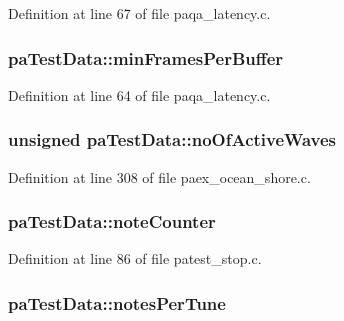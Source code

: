 Definition at line 67 of file paqa\+\_\+latency.\+c.

\subsubsection[{\texorpdfstring{min\+Frames\+Per\+Buffer}{minFramesPerBuffer}}]{ pa\+Test\+Data\+::min\+Frames\+Per\+Buffer}\hypertarget{structpa_test_data_a54a4f685949c89a98b4e45e94ccbc5fd}{}\label{structpa_test_data_a54a4f685949c89a98b4e45e94ccbc5fd}


Definition at line 64 of file paqa\+\_\+latency.\+c.

\subsubsection[{\texorpdfstring{no\+Of\+Active\+Waves}{noOfActiveWaves}}]{\setlength{\rightskip}{0pt plus 5cm}unsigned pa\+Test\+Data\+::no\+Of\+Active\+Waves}\hypertarget{structpa_test_data_acc3a4830f0a4790f7435217066a38872}{}\label{structpa_test_data_acc3a4830f0a4790f7435217066a38872}


Definition at line 308 of file paex\+\_\+ocean\+\_\+shore.\+c.

\subsubsection[{\texorpdfstring{note\+Counter}{noteCounter}}]{ pa\+Test\+Data\+::note\+Counter}\hypertarget{structpa_test_data_a8b23172d34f6fd60be4f3ae4b74b0e79}{}\label{structpa_test_data_a8b23172d34f6fd60be4f3ae4b74b0e79}


Definition at line 86 of file patest\+\_\+stop.\+c.

\subsubsection[{\texorpdfstring{notes\+Per\+Tune}{notesPerTune}}]{ pa\+Test\+Data\+::notes\+Per\+Tune}\hypertarget{structpa_test_data_a3e03feda578f623ae227de84cb26a056}{}\label{structpa_test_data_a3e03feda578f623ae227de84cb26a056}



